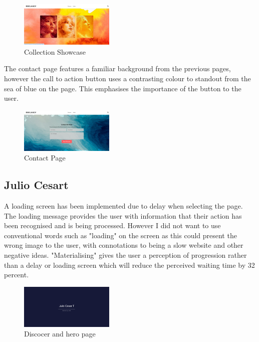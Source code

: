 \documentclass[]{project_final}
\begin{document}
\begin{figure}[ht!]
  \centering
  \includegraphics[width=0.4\textwidth]{AG15.png}
  \vspace*{0.0cm}
  \caption{Collection Showcase}
  \label{fig:1}
\end{figure}

The contact page features a familiar background from the previous pages, however the call to action button uses a contrasting colour to standout from the sea of blue on the page. This emphasises the importance of the button to the user.

\begin{figure}[ht!]
  \centering
  \includegraphics[width=0.4\textwidth]{AG16.png}
  \vspace*{0.0cm}
  \caption{Contact Page}
  \label{fig:1}
\end{figure}

\subsection{Julio Cesart}

A loading screen has been implemented due to delay when selecting the page. The loading message provides the user with information that their action has been recognised and is being processed. However I did not want to use conventional words such as "loading" on the screen as this could present the wrong image to the user, with connotations to being a slow website and other negative ideas. "Materialising" gives the user a perception of progression rather than a delay or loading screen which will reduce the perceived waiting time by 32 percent.

\begin{figure}[ht!]
  \centering
  \includegraphics[width=0.4\textwidth]{AG25.png}
  \vspace*{0.0cm}
  \caption{Discocer and hero page}
  \label{fig:1}
\end{figure}
\end{document}
